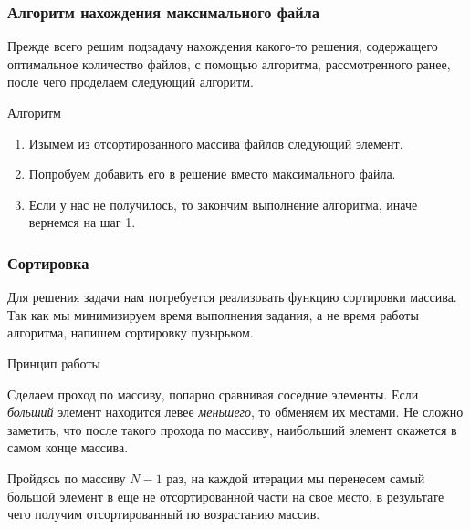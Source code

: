 \documentclass{beamer}
\begin{document}
\begin{frame}

    \frametitle{Алгоритм нахождения максимального файла}

    Прежде всего решим подзадачу нахождения какого-то решения, содержащего оптимальное количество файлов, с помощью алгоритма, рассмотренного ранее, после чего проделаем следующий алгоритм.

    \pause

    \begin{alertblock}{Алгоритм}

        \begin{enumerate}

            \item Изымем из отсортированного массива файлов следующий элемент.

            \item Попробуем добавить его в решение вместо максимального файла.

            \item Если у нас не получилось, то закончим выполнение алгоритма, иначе вернемся на шаг 1.
        \end{enumerate}
        
    \end{alertblock}

\end{frame}

\begin{frame}

    \frametitle{Сортировка}

    Для решения задачи нам потребуется реализовать функцию сортировки массива. Так как мы минимизируем время выполнения задания, а не время работы алгоритма, напишем \alert{сортировку пузырьком}.

    \pause

    \begin{block}{Принцип работы}

        Сделаем проход по массиву, попарно сравнивая соседние элементы. Если \emph{больший} элемент находится левее \emph{меньшего}, то обменяем их местами. Не сложно заметить, что после такого прохода по массиву, наибольший элемент окажется в самом конце массива.

        Пройдясь по массиву $N - 1$ раз, на каждой итерации мы перенесем самый большой элемент в еще не отсортированной части на свое место, в результате чего получим отсортированный по возрастанию массив.

    \end{block}


\end{frame}
\end{document}
